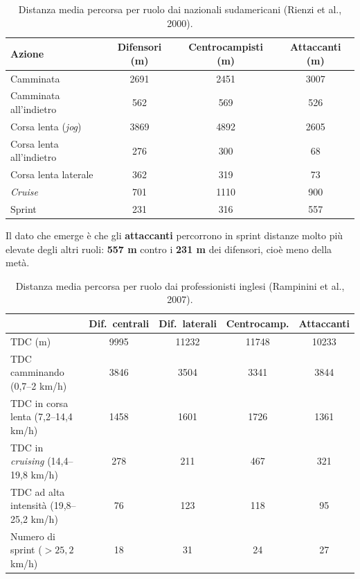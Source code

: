 \begin{table}[htbp]
  \centering
  \small
  \renewcommand{\arraystretch}{1.3}
  \begin{tabularx}{\textwidth}{|X|c|c|c|}
    \hline
    \textbf{Azione} & \textbf{Difensori (m)} & \textbf{Centrocampisti (m)} &
      \textbf{Attaccanti (m)} \\
    \hline
    Camminata & 2691 & 2451 & 3007 \\
    \hline
    Camminata all'indietro & 562 & 569 & 526 \\
    \hline
    Corsa lenta (\textit{jog}) & 3869 & 4892 & 2605 \\
    \hline
    Corsa lenta all'indietro & 276 & 300 & 68 \\
    \hline
    Corsa lenta laterale & 362 & 319 & 73 \\
    \hline
    \textit{Cruise} & 701 & 1110 & 900 \\
    \hline
    Sprint & 231 & 316 & 557 \\
    \hline
  \end{tabularx}
  \caption*{Distanza media percorsa per ruolo dai nazionali sudamericani (Rienzi et al., 2000).}
\end{table}

Il dato che emerge è che gli \textbf{attaccanti} percorrono in sprint distanze molto più elevate
degli altri ruoli: \textbf{557 m} contro i \textbf{231 m} dei difensori, cioè meno della metà.

\begin{table}[htbp]
  \centering
  \small
  \renewcommand{\arraystretch}{1.3}
  \begin{tabularx}{\textwidth}{|X|c|c|c|c|}
    \hline
    & \textbf{Dif.\ centrali} & \textbf{Dif.\ laterali} & \textbf{Centrocamp.} &
      \textbf{Attaccanti} \\
    \hline
    TDC (m) & 9995 & 11232 & 11748 & 10233 \\
    \hline
    TDC camminando (0,7--2 km/h) & 3846 & 3504 & 3341 & 3844 \\
    \hline
    TDC in corsa lenta (7,2--14,4 km/h) & 1458 & 1601 & 1726 & 1361 \\
    \hline
    TDC in \textit{cruising} (14,4--19,8 km/h) & 278 & 211 & 467 & 321 \\
    \hline
    TDC ad alta intensità (19,8--25,2 km/h) & 76 & 123 & 118 & 95 \\
    \hline
    Numero di sprint ($> 25,2$ km/h) & 18 & 31 & 24 & 27 \\
    \hline
  \end{tabularx}
  \caption*{Distanza media percorsa per ruolo dai professionisti inglesi (Rampinini et al., 2007).}
\end{table}

